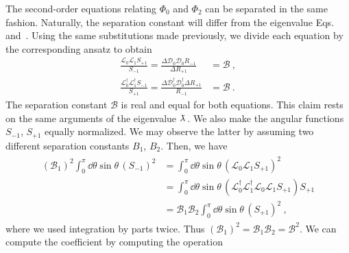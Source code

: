 The second-order equations relating $\Phi_0$ and $\Phi_2$ can be separated in the same fashion. Naturally, the separation constant will differ from the eigenvalue Eqs.~ and~.
Using the same substitutions made previously, we divide each equation by the corresponding ansatz to obtain
\begin{align}
    \label{eq3:separationB}
    \frac{\mathscr{L}_0 \mathscr{L}_1 S_{+1}}{S_{-1}} = \frac{\Delta \mathscr{D}_0 \mathscr{D}_0 R_{-1}}{\Delta R_{+1}} &= \mathscr{B} ~, \\
    \label{eq3:separationBdagger}
    \frac{\mathscr{L}^\dagger_0 \mathscr{L}^\dagger_1 S_{-1}}{S_{+1}} = \frac{\Delta \mathscr{D}^\dagger_0 \mathscr{D}^\dagger_0 \Delta R_{+1}}{R_{-1}} &= \mathscr{B} ~.
\end{align}
The separation constant $\mathscr{B}$ is real and equal for both equations. This claim rests on the same arguments of the eigenvalue $\lambdabar$. We also make the angular functions $S_{-1}$, $S_{+1}$ equally normalized. We may observe the latter by assuming two different separation constants $B_1$, $B_2$. Then, we have
\begin{align}
    \begin{split}
        (\mathscr{B}_1)^2 \int_0^\pi \dd\theta \sin\theta \, (S_{-1})^2 &=
        \int_0^\pi \dd\theta \sin\theta \, ( \mathscr{L}_0 \mathscr{L}_1  S_{+1} )^2 \\
        &= \int_0^\pi \dd\theta \sin\theta \, ( \mathscr{L}^\dagger_0 \mathscr{L}^\dagger_1 \mathscr{L}_0 \mathscr{L}_1  S_{+1} ) S_{+1} \\
        &=  \mathscr{B}_1 \mathscr{B}_2 \int_0^\pi \dd\theta \sin\theta \, (S_{+1})^2 ~,
    \end{split}
\end{align}
where we used integration by parts twice.
Thus $(\mathscr{B}_1)^2 = \mathscr{B}_1 \mathscr{B}_2 = \mathscr{B}^2$.
We can compute the coefficient by computing the operation
